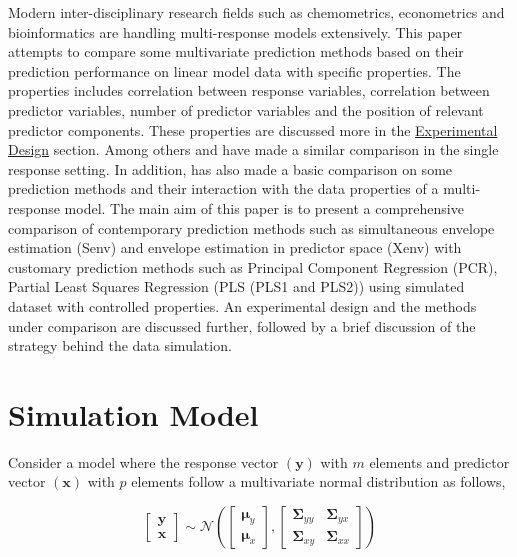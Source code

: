 \documentclass[12pt,3p,authoryear]{elsarticle}
\begin{document}
Modern inter-disciplinary research fields such as chemometrics,
econometrics and bioinformatics are handling multi-response models
extensively. This paper attempts to compare some multivariate prediction
methods based on their prediction performance on linear model data with
specific properties. The properties includes correlation between
response variables, correlation between predictor variables, number of
predictor variables and the position of relevant predictor components.
These properties are discussed more in the
\protect\hyperlink{experimental-design}{Experimental Design} section.
Among others \citet{saebo2015simrel} and \citet{Alm_y_1996} have made a
similar comparison in the single response setting. In addition,
\citet{Rimal2018} has also made a basic comparison on some prediction
methods and their interaction with the data properties of a
multi-response model. The main aim of this paper is to present a
comprehensive comparison of contemporary prediction methods such as
simultaneous envelope estimation (Senv) \citep{cook2015simultaneous} and
envelope estimation in predictor space (Xenv) \citep{cook2010envelope}
with customary prediction methods such as Principal Component Regression
(PCR), Partial Least Squares Regression (PLS \alert{(PLS1 and PLS2)})
using simulated dataset with controlled properties. An experimental
design and the methods under comparison are discussed further, followed
by a brief discussion of the strategy behind the data simulation.

\hypertarget{simulation-model}{%
\section{Simulation Model}\label{simulation-model}}

Consider a model where the response vector \((\mathbf{y})\) with \(m\)
elements and predictor vector \((\mathbf{x})\) with \(p\) elements
follow a multivariate normal distribution as follows,

\begin{equation}
  \begin{bmatrix}
    \mathbf{y} \\ \mathbf{x}
  \end{bmatrix} \sim \mathcal{N}
  \left(
    \begin{bmatrix}
      \boldsymbol{\mu}_y \\
      \boldsymbol{\mu}_x
    \end{bmatrix},
    \begin{bmatrix}
    \boldsymbol{\Sigma}_{yy} & \boldsymbol{\Sigma}_{yx} \\
    \boldsymbol{\Sigma}_{xy} & \boldsymbol{\Sigma}_{xx}
    \end{bmatrix}
  \right)
  \label{eq:model-1}
\end{equation}
\end{document}
